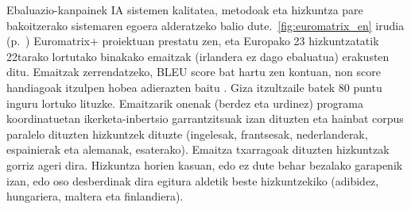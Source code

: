 \begin{multicols}{2}
Ebaluazio-kanpainek IA sistemen kalitatea, metodoak eta hizkuntza pare bakoitzerako sistemaren egoera alderatzeko balio dute.~\ref{fig:euromatrix_en} irudia (p.~\pageref{fig:euromatrix_en}) Euromatrix+ proiektuan prestatu zen, eta Europako 23 hizkuntzatatik 22tarako lortutako binakako emaitzak (irlandera ez dago ebaluatua) erakusten ditu. Emaitzak zerrendatzeko, BLEU score bat hartu zen kontuan, non score handiagoak itzulpen hobea adierazten baitu \cite{bleu1}. Giza itzultzaile batek 80 puntu inguru lortuko lituzke. Emaitzarik onenak (berdez eta urdinez) programa koordinatuetan ikerketa-inbertsio garrantzitsuak izan dituzten eta hainbat corpus paralelo dituzten hizkuntzek dituzte (ingelesak, frantsesak, nederlanderak, espainierak eta alemanak, esaterako). Emaitza txarragoak dituzten hizkuntzak gorriz ageri dira. Hizkuntza horien kasuan, edo ez dute behar bezalako garapenik izan, edo oso desberdinak dira egitura aldetik beste hizkuntzekiko (adibidez, hungariera, maltera eta finlandiera).


\end{multicols}
